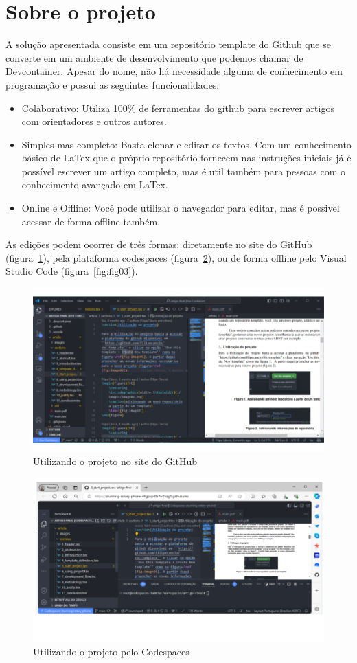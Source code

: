 \section{Sobre o projeto}

A solução apresentada consiste em um repositório template do Github  que se converte em um ambiente de desenvolvimento que podemos chamar de Devcontainer. Apesar do nome, não  há necessidade alguma de conhecimento em programação e possui as seguintes funcionalidades:

\begin{itemize}
	\item Colaborativo: Utiliza 100\% de ferramentas do github para escrever artigos com orientadores e outros autores.
	\item Simples mas completo: Basta clonar e editar os textos. Com um conhecimento básico de LaTex que o próprio repositório fornecem nas instruções iniciais já é possível escrever um artigo completo, mas é util também para pessoas com o conhecimento avançado em LaTex.
	\item Online e Offline: Você pode utilizar o navegador para editar, mas é possivel acessar de forma offline também.
\end{itemize}


As edições podem ocorrer de três formas: diretamente no site do GitHub (figura~\ref{fig:fig01}), pela plataforma codespaces (figura~\ref{fig:fig02}), ou de forma offline pelo Visual Studio Code (figura~\ref{fig:fig03}).


\begin{figure}[ht]
	\centering
	\includegraphics[width=.6\textwidth]{./images/fig01.png}
	\caption{Utilizando o projeto no site do GitHub}
	\label{fig:fig01}
\end{figure}

\begin{figure}[ht]
	\centering
	\includegraphics[width=.6\textwidth]{./images/fig02.png}
	\caption{Utilizando o projeto pelo Codespaces}
	\label{fig:fig02}
\end{figure}

